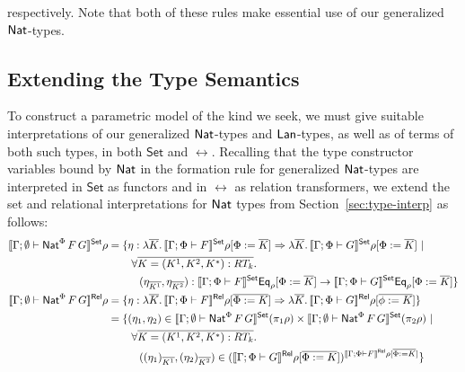\documentclass{lmcs}
\theoremstyle{plain}\newtheorem{satz}[thm]{Satz}
\newcommand{\set}{\mathsf{Set}}
\begin{document}
\vspace*{0.05in}

\noindent
respectively. Note that both of these rules make essential use of our
generalized $\mathsf{Nat}$-types.

\subsection{Extending the Type Semantics}

To construct a parametric model of the kind we seek, we must give
suitable interpretations of our generalized $\mathsf{Nat}$-types and
$\mathsf{Lan}$-types, as well as of terms of both such types, in both $\set$
and $\rel$. Recalling that the type constructor variables bound by
$\mathsf{Nat}$ in the formation rule for generalized $\mathsf{Nat}$-types are
interpreted in $\set$ as functors and in $\rel$ as relation
transformers, we extend the set and relational interpretations for
$\mathsf{Nat}$ types from Section~\ref{sec:type-interp} as follows:
\begin{align*}
\setsem{\Gamma; \emptyset \vdash \Nat^\Phi\,F\,G}\rho
&= \{\eta : \lambda \ol{K}. \,\setsem{\Gamma; \Phi \vdash F}\rho[\Phi := \ol K] 
  \Rightarrow \lambda \ol{K}.\,\setsem{\Gamma; \Phi \vdash G}\rho[\Phi := \ol K]~|~\\ 
&\hspace{0.3in} \forall \ol{K = (K^1, K^2, K^*) : RT_k}.\\
&\hspace{0.4in} (\eta_{\overline{K^1}}, \eta_{\overline{K^2}})
: \setsem{\Gamma; \Phi \vdash F}\Eq_{\rho}[\Phi := \ol K]
\rightarrow \setsem{\Gamma; \Phi \vdash G}\Eq_{\rho}[\Phi := \ol K] \} \\
\relsem{\Gamma; \emptyset \vdash \Nat^\Phi \,F\,G}\rho
&= \{\eta : \lambda \ol{K}.\,\relsem{\Gamma; \Phi \vdash F}\rho[\ol{\Phi := K}]
\Rightarrow \lambda \ol{K}. \,\relsem{\Gamma; \Phi \vdash G}\rho[\ol{\phi := K}]\}\\
&=
  \{(\eta_1,\eta_2) \in \setsem{\Gamma; \emptyset
    \vdash \Nat^\Phi
    \,F\,G} (\pi_1 \rho) \times \setsem{ 
    \Gamma;\emptyset
    \vdash \Nat^\Phi \,F\,G} (\pi_2
  \rho)~|~\\
& \hspace{0.3in} \forall \ol{K = (K^1, K^2, K^*) : RT_{k}}.\\
& \hspace{0.4in} ((\eta_1)_{\ol{K^1}},(\eta_2)_{\ol{K^2}}) \in
  (\relsem{\Gamma; \Phi \vdash G}\rho[\ol{\Phi := K}])^{\relsem{\Gamma;\Phi\vdash F}\rho[\ol{\Phi := K}]} \}\\  
\end{align*}
\end{document}
